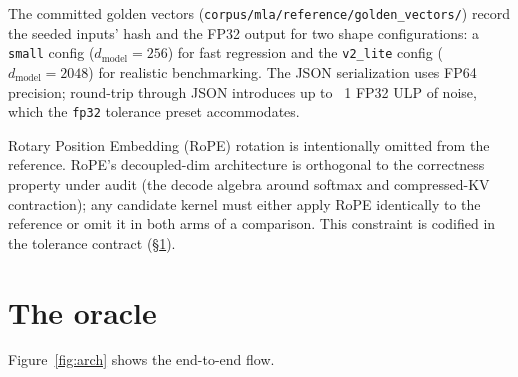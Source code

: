 \documentclass[11pt]{article}
\begin{document}
The committed golden vectors
(\texttt{corpus/mla/reference/golden\_vectors/}) record the seeded
inputs' hash and the FP32 output for two shape configurations: a
\texttt{small} config ($d_\text{model}{=}256$) for fast regression and
the \texttt{v2\_lite} config ($d_\text{model}{=}2048$) for realistic
benchmarking. The JSON serialization uses FP64 precision; round-trip
through JSON introduces up to ~1 FP32 ULP of noise, which the
\texttt{fp32} tolerance preset accommodates.

Rotary Position Embedding (RoPE) rotation is intentionally omitted from
the reference. RoPE's decoupled-dim architecture is orthogonal to the
correctness property under audit (the decode algebra around softmax and
compressed-KV contraction); any candidate kernel must either apply RoPE
identically to the reference or omit it in both arms of a comparison.
This constraint is codified in the tolerance contract (\S\ref{sec:oracle}).

\section{The oracle}
\label{sec:oracle}

Figure~\ref{fig:arch} shows the end-to-end flow.
\end{document}

